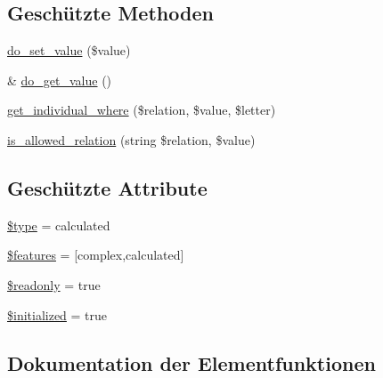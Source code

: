 \subsection*{Geschützte Methoden}
\begin{DoxyCompactItemize}
\item 
\hyperlink{classSunhill_1_1Properties_1_1oo__property__calculated_a9741e2fe9258fd83e6dccee056c56c8e}{do\+\_\+set\+\_\+value} (\$value)
\item 
\& \hyperlink{classSunhill_1_1Properties_1_1oo__property__calculated_ad3fe10010609e9508e7e925a89f28a9e}{do\+\_\+get\+\_\+value} ()
\item 
\hyperlink{classSunhill_1_1Properties_1_1oo__property__calculated_abd05c50ca9bb3dde8617b663989e980e}{get\+\_\+individual\+\_\+where} (\$relation, \$value, \$letter)
\item 
\hyperlink{classSunhill_1_1Properties_1_1oo__property__calculated_a7eb36887995de96d105555c8fa89c244}{is\+\_\+allowed\+\_\+relation} (string \$relation, \$value)
\end{DoxyCompactItemize}
\subsection*{Geschützte Attribute}
\begin{DoxyCompactItemize}
\item 
\hyperlink{classSunhill_1_1Properties_1_1oo__property__calculated_a969b059fa3e15f888f254343df78f125}{\$type} = \textquotesingle{}calculated\textquotesingle{}
\item 
\hyperlink{classSunhill_1_1Properties_1_1oo__property__calculated_a376cb07248255e7de92a96c8bb6bda4d}{\$features} = \mbox{[}\textquotesingle{}complex\textquotesingle{},\textquotesingle{}calculated\textquotesingle{}\mbox{]}
\item 
\hyperlink{classSunhill_1_1Properties_1_1oo__property__calculated_ad391103de5707329800ec004ab7bc72e}{\$readonly} = true
\item 
\hyperlink{classSunhill_1_1Properties_1_1oo__property__calculated_a256aee11f2cec1647b36af15d0231806}{\$initialized} = true
\end{DoxyCompactItemize}


\subsection{Dokumentation der Elementfunktionen}
\mbox{\label{classSunhill_1_1Properties_1_1oo__property__calculated_ad3fe10010609e9508e7e925a89f28a9e}} 
